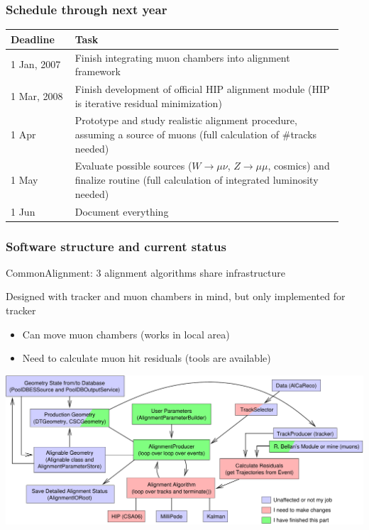 \documentclass[compress]{beamer}
\begin{document}
\begin{frame}
\frametitle{Schedule through next year}

\renewcommand{\arraystretch}{1.25}
\begin{tabular}{p{0.18\linewidth} p{0.75\linewidth}}
Deadline & Task \\ \hline

1 Jan, \hfill 2007 & Finish integrating muon chambers into alignment framework \\

1 Mar, \hfill 2008 & Finish development of official HIP alignment \mbox{module} (HIP
is iterative residual minimization) \\

1 Apr & Prototype and study realistic alignment procedure, assuming a
source of muons (full calculation of \#tracks needed) \\
 
1 May & Evaluate possible sources ($W\to\mu\nu$, $Z\to\mu\mu$,
cosmics) and finalize routine (full calculation of \mbox{integrated}
luminosity needed) \\

1 Jun & Document everything
\end{tabular}
\end{frame}

\begin{frame}
\frametitle{Software structure and current status}

CommonAlignment: 3 alignment algorithms share infrastructure

Designed with tracker and muon chambers in mind, but only implemented
for tracker

\begin{itemize}
\item Can move muon chambers (works in local area)
\item Need to calculate muon hit residuals (tools are available)
\end{itemize}

\begin{center}
\includegraphics[width=\linewidth]{flow_chart}
\end{center}
\end{frame}
\end{document}
